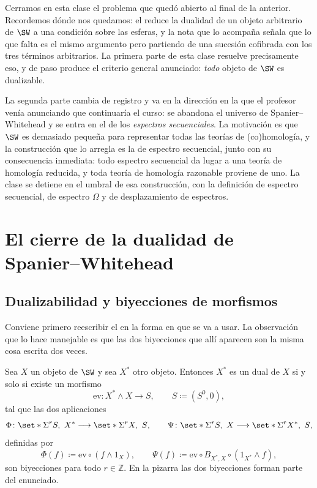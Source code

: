 Cerramos en esta clase el problema que quedó abierto al final de la anterior. Recordemos dónde nos quedamos: el  reduce la dualidad de un objeto arbitrario de $\SW$ a una condición sobre las esferas, y la nota que lo acompaña señala que lo que falta es el mismo argumento pero partiendo de una sucesión cofibrada con los tres términos arbitrarios. La primera parte de esta clase resuelve precisamente eso, y de paso produce el criterio general anunciado: \emph{todo} objeto de $\SW$ es dualizable.

La segunda parte cambia de registro y va en la dirección en la que el profesor venía anunciando que continuaría el curso: se abandona el universo de Spanier--Whitehead y se entra en el de los \emph{espectros secuenciales}. La motivación es que $\SW$ es demasiado pequeña para representar todas las teorías de (co)homología, y la construcción que lo arregla es la de espectro secuencial, junto con su consecuencia inmediata: todo espectro secuencial da lugar a una teoría de homología reducida, y toda teoría de homología razonable proviene de uno. La clase se detiene en el umbral de esa construcción, con la definición de espectro secuencial, de espectro $\Omega$ y de desplazamiento de espectros.

\section{El cierre de la dualidad de Spanier--Whitehead}

\subsection{Dualizabilidad y biyecciones de morfismos}

Conviene primero reescribir el  en la forma en que se va a usar. La observación que lo hace manejable es que las dos biyecciones que allí aparecen son la misma cosa escrita dos veces.

\begin{prop}\label{prop:dual-biyectiva}
Sea $X$ un objeto de $\SW$ y sea $X^*$ otro objeto. Entonces $X^*$ es un dual de $X$ si y solo si existe un morfismo
\[
\mathrm{ev}\colon X^*\wedge X\longrightarrow S,
\qquad
S\coloneqq(S^0,0),
\]
tal que las dos aplicaciones
\[
\Phi\colon\set*{\Sigma^rS,\ X^*}\longrightarrow\set*{\Sigma^rX,\ S},
\qquad
\Psi\colon\set*{\Sigma^rS,\ X}\longrightarrow\set*{\Sigma^rX^*,\ S},
\]
definidas por
\[
\Phi(f)\coloneqq\mathrm{ev}\circ(f\wedge1_X),
\qquad
\Psi(f)\coloneqq\mathrm{ev}\circ B_{X^*,X}\circ(1_{X^*}\wedge f),
\]
son biyecciones para todo $r\in\mathbb Z$. En la pizarra las dos biyecciones forman parte del enunciado.
\end{prop}

